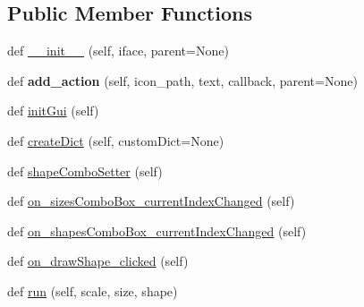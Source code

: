 \subsection*{Public Member Functions}
\begin{DoxyCompactItemize}
\item 
def \mbox{\hyperlink{class_dsg_tools_1_1_production_tools_1_1_minimum_area_tool_1_1minimum_area_tool_1_1_minimum_area_tool_a9a433c8f31d9d3eef80462dda2dba5b2}{\+\_\+\+\_\+init\+\_\+\+\_\+}} (self, iface, parent=None)
\item 
\mbox{\label{class_dsg_tools_1_1_production_tools_1_1_minimum_area_tool_1_1minimum_area_tool_1_1_minimum_area_tool_a28ffcefea9b99973cbf11c46d670ec9a}} 
def {\bfseries add\+\_\+action} (self, icon\+\_\+path, text, callback, parent=None)
\item 
def \mbox{\hyperlink{class_dsg_tools_1_1_production_tools_1_1_minimum_area_tool_1_1minimum_area_tool_1_1_minimum_area_tool_aa2fe7d88594cf13c9740612a504c532f}{init\+Gui}} (self)
\item 
def \mbox{\hyperlink{class_dsg_tools_1_1_production_tools_1_1_minimum_area_tool_1_1minimum_area_tool_1_1_minimum_area_tool_a15618d07c2bcdd70e2d9aaa3f6340eae}{create\+Dict}} (self, custom\+Dict=None)
\item 
def \mbox{\hyperlink{class_dsg_tools_1_1_production_tools_1_1_minimum_area_tool_1_1minimum_area_tool_1_1_minimum_area_tool_a9834d0ef71f8764d64fb8a2c524db0b4}{shape\+Combo\+Setter}} (self)
\item 
def \mbox{\hyperlink{class_dsg_tools_1_1_production_tools_1_1_minimum_area_tool_1_1minimum_area_tool_1_1_minimum_area_tool_ab2f5de467fbe307eea2d5c690bcaed1b}{on\+\_\+sizes\+Combo\+Box\+\_\+current\+Index\+Changed}} (self)
\item 
def \mbox{\hyperlink{class_dsg_tools_1_1_production_tools_1_1_minimum_area_tool_1_1minimum_area_tool_1_1_minimum_area_tool_a8387c36dc1e57144fedd4ce6c3e198c1}{on\+\_\+shapes\+Combo\+Box\+\_\+current\+Index\+Changed}} (self)
\item 
def \mbox{\hyperlink{class_dsg_tools_1_1_production_tools_1_1_minimum_area_tool_1_1minimum_area_tool_1_1_minimum_area_tool_af30e08293f857068625c2c67fa63cbcb}{on\+\_\+draw\+Shape\+\_\+clicked}} (self)
\item 
def \mbox{\hyperlink{class_dsg_tools_1_1_production_tools_1_1_minimum_area_tool_1_1minimum_area_tool_1_1_minimum_area_tool_a84120b6ed248ccb405109998d660698a}{run}} (self, scale, size, shape)

\end{DoxyCompactItemize}
